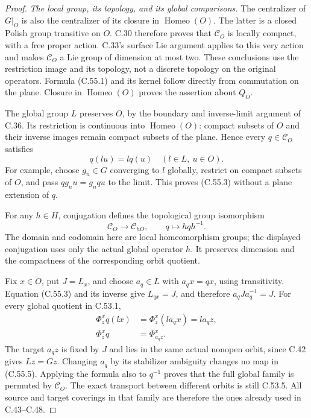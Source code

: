 \begin{proof}
\emph{The local group, its topology, and its global comparisons.}
The centralizer of $G|_O$ is also the centralizer of its
closure in $\operatorname{Homeo}(O)$. The latter is a
closed Polish group transitive on $O$. C.30 therefore
proves that $\mathcal C_O$ is locally compact, with a
free proper action. C.33's surface Lie argument applies
to this very action and makes $\mathcal C_O$ a Lie group
of dimension at most two. These conclusions use the
restriction image and its topology, not a discrete
topology on the original operators. Formula (C.55.1)
and its kernel follow directly from commutation on the
plane. Closure in $\operatorname{Homeo}(O)$ proves the
assertion about $Q_O$.

The global group $L$ preserves $O$, by the boundary
and inverse-limit argument of C.36. Its restriction is
continuous into $\operatorname{Homeo}(O)$: compact subsets
of $O$ and their inverse images remain compact subsets
of the plane. Hence every $q\in\mathcal C_O$ satisfies
\[
                      q(lu)=lq(u)\quad(l\in L,\ u\in O).
                                                        \tag{C.55.3}
\]
For example, choose $g_n\in G$ converging to $l$ globally,
restrict on compact subsets of $O$, and pass
$qg_nu=g_nqu$ to the limit. This proves (C.55.3)
without a plane extension of $q$.

For any $h\in H$, conjugation defines the topological
group isomorphism
\[
 \mathcal C_O\longrightarrow\mathcal C_{hO},\qquad
                         q\longmapsto hqh^{-1}.
                                                        \tag{C.55.4}
\]
The domain and codomain here are local homeomorphism
groups; the displayed conjugation uses only the actual
global operator $h$. It preserves dimension and the
compactness of the corresponding orbit quotient.

Fix $x\in O$, put $J=L_x$, and choose $a_q\in L$ with
$a_qx=qx$, using transitivity. Equation (C.55.3) and its
inverse give $L_{qx}=J$, and therefore
$a_qJa_q^{-1}=J$. For every global quotient in C.53.1,
\[
 \begin{split}
 \Phi_z^x q(lx)&=\Phi_z^x(la_qx)=la_qz,\\
                  \Phi_z^x q&=\Phi_{a_qz}^x.
 \end{split}                                            \tag{C.55.5}
\]
The target $a_qz$ is fixed by $J$ and lies in the same
actual nonopen orbit, since C.42 gives $Lz=Gz$.
Changing $a_q$ by its stabilizer ambiguity changes no
map in (C.55.5). Applying the formula also to $q^{-1}$
proves that the full global family is permuted by
$\mathcal C_O$. The exact transport between different
orbits is still C.53.5. All source and target coverings
in that family are therefore the ones already used
in C.43--C.48.


\end{proof}
